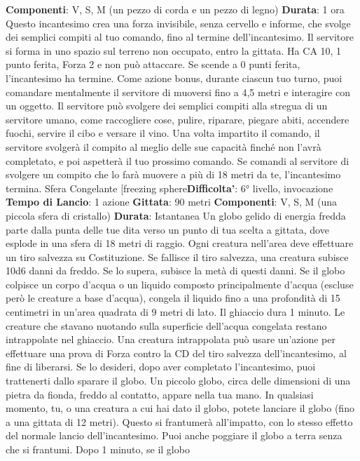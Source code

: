 \begin{multicols}{2}
\textbf{Componenti}: V, S, M (un pezzo di corda e un pezzo di
legno)
\textbf{Durata}: 1 ora
Questo incantesimo crea una forza invisibile, senza
cervello e informe, che svolge dei semplici compiti al
tuo comando, fino al termine dell’incantesimo. Il
servitore si forma in uno spazio sul terreno non
occupato, entro la gittata. Ha CA 10, 1 punto ferita,
Forza 2 e non può attaccare. Se scende a 0 punti ferita,
l’incantesimo ha termine.
Come azione bonus, durante ciascun tuo turno, puoi
comandare mentalmente il servitore di muoversi fino a
4,5 metri e interagire con un oggetto. Il servitore può
svolgere dei semplici compiti alla stregua di un servitore
umano, come raccogliere cose, pulire, riparare, piegare
abiti, accendere fuochi, servire il cibo e versare il vino.
Una volta impartito il comando, il servitore svolgerà il
compito al meglio delle sue capacità finché non l’avrà
completato, e poi aspetterà il tuo prossimo comando.
Se comandi al servitore di svolgere un compito che lo
farà muovere a più di 18 metri da te, l’incantesimo
termina.
Sfera Congelante
[freezing sphere\textbf{Difficolta'}:
6° livello, invocazione
\textbf{Tempo di Lancio}: 1 azione
\textbf{Gittata}: 90 metri
\textbf{Componenti}: V, S, M (una piccola sfera di cristallo)
\textbf{Durata}: Istantanea
Un globo gelido di energia fredda parte dalla punta
delle tue dita verso un punto di tua scelta a gittata, dove
esplode in una sfera di 18 metri di raggio. Ogni creatura
nell’area deve effettuare un tiro salvezza su
Costituzione. Se fallisce il tiro salvezza, una creatura
subisce 10d6 danni da freddo. Se lo supera, subisce la
metà di questi danni.
Se il globo colpisce un corpo d’acqua o un liquido
composto principalmente d’acqua (escluse però le
creature a base d’acqua), congela il liquido fino a una
profondità di 15 centimetri in un’area quadrata di 9 metri
di lato. Il ghiaccio dura 1 minuto. Le creature che
stavano nuotando sulla superficie dell’acqua congelata
restano intrappolate nel ghiaccio. Una creatura
intrappolata può usare un’azione per effettuare una
prova di Forza contro la CD del tiro salvezza
dell’incantesimo, al fine di liberarsi.
Se lo desideri, dopo aver completato l’incantesimo, puoi
trattenerti dallo sparare il globo. Un piccolo globo, circa
delle dimensioni di una pietra da fionda, freddo al
contatto, appare nella tua mano. In qualsiasi momento,
tu, o una creatura a cui hai dato il globo, potete lanciare
il globo (fino a una gittata di 12 metri). Questo si
frantumerà all’impatto, con lo stesso effetto del normale
lancio dell’incantesimo. Puoi anche poggiare il globo a
terra senza che si frantumi. Dopo 1 minuto, se il globo

\end{multicols}

